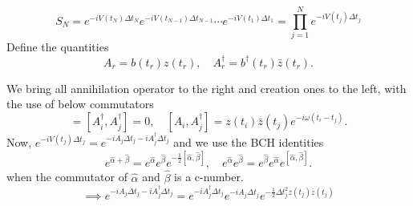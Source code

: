 \documentclass{article}
\begin{document}
\begin{equation}
	S_N = e^{-i V(t_N)\Delta t_N}e^{-i V(t_{N-1})\Delta t_{N-1}} \cdots  e^{-i V(t_1)\Delta t_1} = \prod_{j=1}^N e^{-i V(t_{j})\Delta t_{j}}
\end{equation}
Define the quantities 
\begin{equation}
	A_r =  b(t_r) z(t_r), \quad 	A_r ^\dagger =  b^\dagger (t_r) \bar{z}(t_r).
\end{equation}

We bring all annihilation operator to the right and creation ones to the left, with the use of below commutators
\begin{equation}
	[A_i, A_j] = [A^\dagger_i, A^\dagger_j] = 0, \quad [A_i, A^\dagger _j] = z(t_i)\bar{z}(t_j) e^{-i\omega (t_i - t_j)}.
\end{equation}
Now, $e^{-i V(t_{j})\Delta t_{j}} = e^{-iA_j \Delta t_{j}-iA^\dagger_j \Delta t_{j} }$ and we use the BCH identities
\begin{equation}
	e^{\hat{\alpha}+\hat{\beta}} = e^{\hat{\alpha}}e^{\hat{\beta}}e^{-\frac{1}{2}[\hat{\alpha},\hat{\beta}]}, \quad  e^{\hat{\alpha}}e^{\hat{\beta}} = e^{\hat{\beta}}e^{\hat{\alpha}}e^{[\hat{\alpha},\hat{\beta}]}.
\end{equation}
when the commutator of $\hat{\alpha}$ and $\hat{\beta}$ is a c-number.
\begin{equation}
	\implies e^{-iA_j \Delta t_{j}-iA^\dagger_j \Delta t_{j} } =e^{-iA^\dagger_j \Delta t_{j} }  e^{-iA_j \Delta t_{j}}e^{-\frac{1}{2}\Delta t_j ^2 z(t_j)\bar{z}(t_j)}
\end{equation}
\end{document}

